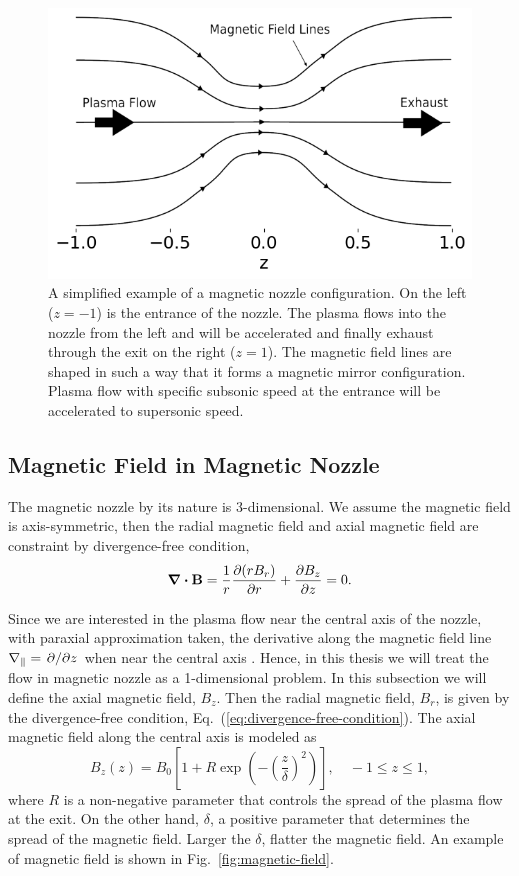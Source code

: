 \begin{figure}[htbp]
	\centering
	\includegraphics[width=0.7\linewidth]{figures/magnetic-nozzle.png}
	\caption{A simplified example of a magnetic nozzle configuration. On the left ($z=-1$) is the entrance of the nozzle. The plasma flows into the nozzle from the left and will be accelerated and finally exhaust through the exit on the right ($z=1$). The magnetic field lines are shaped in such a way that it forms a magnetic mirror configuration. Plasma flow with specific subsonic speed at the entrance will be accelerated to supersonic speed.}
	\label{fig:magnetic-nozzle}
\end{figure}

\subsection{Magnetic Field in Magnetic Nozzle} \label{sec:magnetic-field-in-nozzle}
The magnetic nozzle by its nature is 3-dimensional. We assume the magnetic field is axis-symmetric, then the radial magnetic field and axial magnetic field are constraint by divergence-free condition,
\begin{equation}
	\div\mathbf{B} = \frac{1}{r}\pdv{(rB_r)}{r} + \pdv{B_z}{z} = 0.
	\label{eq:divergence-free-condition}
\end{equation}

Since we are interested in the plasma flow near the central axis of the nozzle, with paraxial approximation taken, the derivative along the magnetic field line $\nabla_\parallel = \pdv*{z}$ when near the central axis \cite{smolyakov_quasineutral_2021}. Hence, in this thesis we will treat the flow in magnetic nozzle as a 1-dimensional problem. In this subsection we will define the axial magnetic field, $B_z$. Then the radial magnetic field, $B_r$, is given by the divergence-free condition, Eq.~(\ref{eq:divergence-free-condition}). The axial magnetic field along the central axis is modeled as
\begin{equation}
	B_z(z) = B_0 \left[1 + R\exp(-\left(\frac{z}{\delta}\right)^2)\right], \quad -1\leq z \leq 1,
\end{equation}
where $R$ is a non-negative parameter that controls the spread of the plasma flow at the exit. On the other hand, $\delta$, a positive parameter that determines the spread of the magnetic field. Larger the $\delta$, flatter the magnetic field. An example of magnetic field is shown in Fig.~\ref{fig:magnetic-field}.

